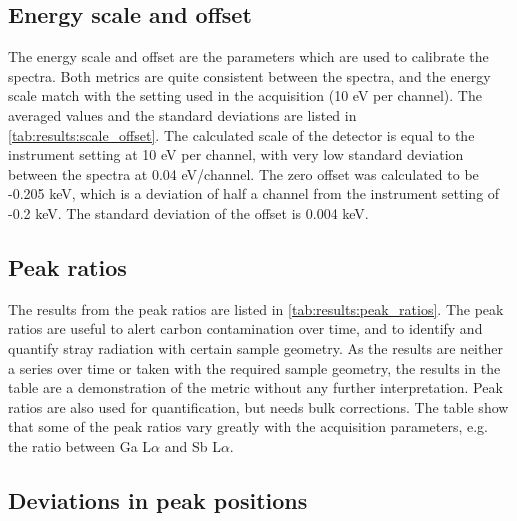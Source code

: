 


\subsection*{Energy scale and offset}
\label{results:setup:scale_offset}

The energy scale and offset are the parameters which are used to calibrate the spectra.
Both metrics are quite consistent between the spectra, and the energy scale match with the setting used in the acquisition (10 eV per channel).
The averaged values and the standard deviations are listed in \cref{tab:results:scale_offset}.
The calculated scale of the detector is equal to the instrument setting at 10 eV per channel, with very low standard deviation between the spectra at 0.04 eV/channel.
The zero offset was calculated to be -0.205 keV, which is a deviation of half a channel from the instrument setting of -0.2 keV.
The standard deviation of the offset is 0.004 keV.






\subsection*{Peak ratios}
\label{results:setup:peak_ratios}

The results from the peak ratios are listed in \cref{tab:results:peak_ratios}.
The peak ratios are useful to alert carbon contamination over time, and to identify and quantify stray radiation with certain sample geometry.
As the results are neither a series over time or taken with the required sample geometry, the results in the table are a demonstration of the metric without any further interpretation.
Peak ratios are also used for quantification, but needs bulk corrections.
The table show that some of the peak ratios vary greatly with the acquisition parameters, e.g. the ratio between Ga L$\alpha$ and Sb L$\alpha$.








\subsection*{Deviations in peak positions}
\label{results:setup:peak_positions}

